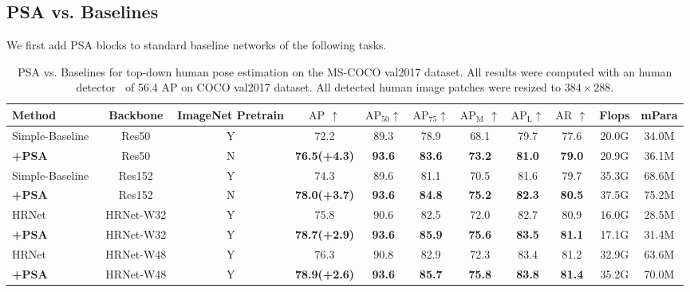 \documentclass[10pt,twocolumn,letterpaper]{article}
\begin{document}
\subsection{PSA vs. Baselines}
We first add PSA blocks to standard baseline networks of the following tasks.

\begin{table*}[!htb]
\centering
\fontsize{7}{8}\selectfont
\setlength{\tabcolsep}{4.6pt}
\begin{tabular}{l|c|c|cccccc|c|c}
\hline
Method       & Backbone  & ImageNet Pretrain    & $\mathrm{AP}$ $\uparrow$  & $\mathrm{AP_{50}}$$\uparrow$ & $\mathrm{AP_{75}}$$\uparrow$ & $\mathrm{AP_{M}}$ $\uparrow$ & $\mathrm{AP_{L}}$$\uparrow$  & $\mathrm{AR}$ $\uparrow$ & Flops  & mPara  \\ \hline \hline
Simple-Baseline~\cite{Xiao18} & Res50 & Y &  72.2 &89.3 &78.9 & 68.1 &79.7 &77.6 &20.0G&34.0M\\
\textbf{+PSA}    & Res50   &N   &  \textbf{76.5(+4.3)} & \textbf{93.6} & \textbf{83.6} & \textbf{73.2} & \textbf{81.0} &  \textbf{79.0} & 20.9G & 36.1M\\
\hline
Simple-Baseline~\cite{Xiao18} & Res152 & Y &  74.3 &89.6 &81.1 &70.5 &81.6 &79.7 &35.3G&68.6M\\
\textbf{+PSA}      & Res152 & N    &  \textbf{78.0(+3.7)} & \textbf{93.6} & \textbf{84.8} & \textbf{75.2} & \textbf{82.3} &  \textbf{80.5}  &37.5G & 75.2M  \\
\hline
HRNet~\cite{Sun2019} & HRNet-W32 & Y &   75.8 &90.6  &82.5 & 72.0 & 82.7 &  80.9 &16.0G&28.5M\\
\textbf{+PSA}   & HRNet-W32 & Y& \textbf{78.7(+2.9)} & \textbf{93.6} & \textbf{85.9} & \textbf{75.6} & \textbf{83.5} &  \textbf{81.1}  &17.1G & 31.4M\\ 
\hline
HRNet~\cite{Sun2019} & HRNet-W48 & Y &   76.3 &90.8 &82.9 &72.3 &83.4 &81.2 &32.9G&63.6M\\
\textbf{+PSA}      & HRNet-W48 & Y    &  \textbf{78.9(+2.6)} & \textbf{93.6} & \textbf{85.7} & \textbf{75.8} & \textbf{83.8} &  \textbf{81.4}  &35.2G&70.0M\\ 
\hline
\end{tabular}
\caption{ PSA vs. Baselines for top-down human pose estimation on the MS-COCO val2017 dataset. All results were computed with an human detector~\cite{Xiao18} of 56.4 AP on COCO val2017 dataset. All detected human image patches were resized to $384\times 288$. }
\label{table:COCO_Pose}
\end{table*}
\end{document}
